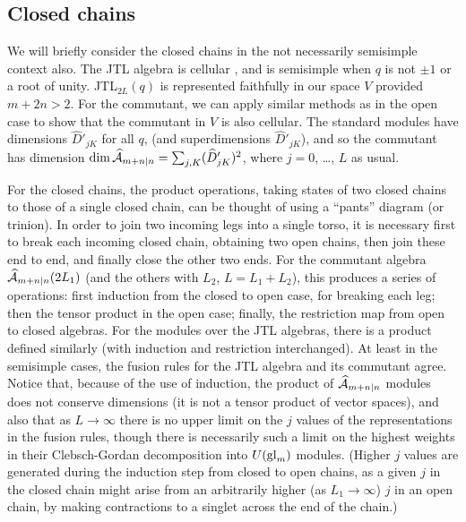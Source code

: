 \documentclass[twocolumn,floats,pra]{revtex4}
\def \cA {{\cal A}}
\begin{document}
\subsection{Closed chains}

We will briefly consider the closed chains in the not necessarily
semisimple context also. The JTL algebra is cellular \cite{gl},
and is semisimple when $q$ is not $\pm 1$ or a root of unity.
JTL$_{2L}(q)$ is represented faithfully in our space $V$ provided
$m+2n>2$. For the commutant, we can apply similar methods as in
the open case to show that the commutant in $V$ is also cellular.
The standard modules have dimensions $\widehat{D}'_{jK}$ for all
$q$, (and superdimensions $\widehat{D}'_{jK}$), and so the
commutant has dimension ${\rm dim}\, \widehat{\cA}_{m+n|n}=
\sum_{j,K}(\widehat{D}'_{jK})^2$, where $j=0$, \ldots, $L$ as
usual.

For the closed chains, the product operations, taking states of
two closed chains to those of a single closed chain, can be
thought of using a ``pants'' diagram (or trinion). In order to
join two incoming legs into a single torso, it is necessary first
to break each incoming closed chain, obtaining two open chains,
then join these end to end, and finally close the other two ends.
For the commutant algebra $\widehat{\cA}_{m+n|n}(2L_1)$ (and the
others with $L_2$, $L=L_1+L_2$), this produces a series of
operations: first induction from the closed to open case, for
breaking each leg; then the tensor product in the open case;
finally, the restriction map from open to closed algebras. For the
modules over the JTL algebras, there is a product defined
similarly (with induction and restriction interchanged). At least
in the semisimple cases, the fusion rules for the JTL algebra and
its commutant agree. Notice that, because of the use of induction,
the product of $\widehat{\cA}_{m+n|n}$ modules does not conserve
dimensions (it is not a tensor product of vector spaces), and also
that as $L\to\infty$ there is no upper limit on the $j$ values of
the representations in the fusion rules, though there is
necessarily such a limit on the highest weights in their
Clebsch-Gordan decomposition into $U({\rm gl}_m)$ modules. (Higher
$j$ values are generated during the induction step from closed to
open chains, as a given $j$ in the closed chain might arise from
an arbitrarily higher (as $L_1\to\infty$) $j$ in an open chain, by
making contractions to a singlet across the end of the chain.)
\end{document}
